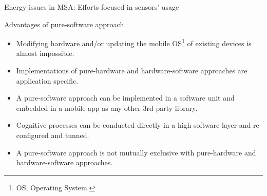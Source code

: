 
\begin{frame}{Energy issues in MSA: Efforts focused in sensors' usage}
  \begin{block}{Advantages of pure-software approach}
    \begin{itemize}   
      \item
        Modifying hardware and/or updating the mobile OS\footnote{OS, Operating System.} of existing devices is almost impossible.
      \item
        Implementations of pure-hardware and hardware-software approaches are application specific.
      \item
        A pure-software approach can be implemented in a software unit and embedded in a mobile app as any other 3rd party library.
      \item
        Cognitive processes can be conducted directly in a high software layer and re-configured and tunned.
      \item 
        A pure-software approach is not mutually exclusive with pure-hardware and hardware-software approaches.
    \end{itemize}
  \end{block}
\end{frame}


